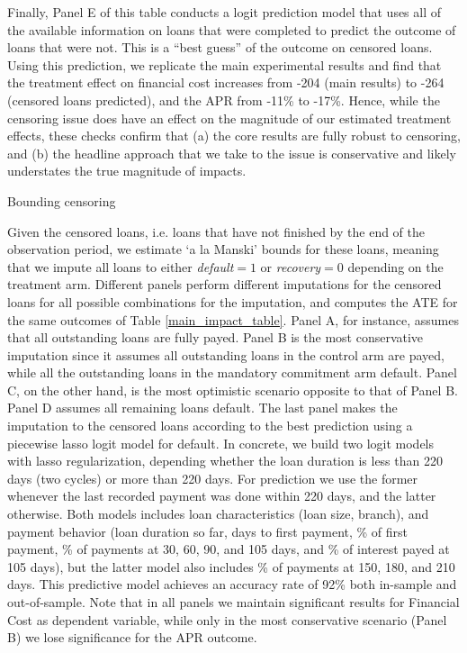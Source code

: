 \begin{appendix}
Finally, Panel E of this table conducts a logit prediction model that uses all of the available information on loans that were completed to predict the outcome of loans that were not.  This is a ``best guess'' of the outcome on censored loans.  Using this prediction, we replicate the main experimental results and find that the treatment effect on financial cost increases from -204 (main results) to -264 (censored loans predicted), and the APR from -11\% to -17\%.  Hence, while the censoring issue does have an effect on the magnitude of our estimated treatment effects, these  checks confirm that (a) the core results are fully robust to censoring, and (b) the headline approach that we take to the issue is conservative and likely understates the true magnitude of impacts.





\begin{table}[H]
\caption{Bounding censoring} 
\label{bounding_censoring}
\begin{center}
\resizebox{0.75\textwidth}{!}{
\footnotesize{}
}
\end{center}
 
\end{table}
 \footnotesize{ Given the censored loans, i.e. loans that have not finished by the end of the observation period, we estimate `a la Manski' bounds for these loans, meaning that we impute all loans to either \emph{default}$=1$ or \emph{recovery}$=0$ depending on the treatment arm. Different panels perform different imputations for the censored loans for all possible combinations for the imputation, and computes the ATE for the same outcomes of Table \ref{main_impact_table}. Panel A, for instance, assumes that all outstanding loans are fully payed. Panel B is the most conservative imputation since it assumes all outstanding loans in the control arm are payed, while all the outstanding loans in the mandatory commitment arm default. Panel C, on the other hand, is the most optimistic scenario opposite to that of Panel B. Panel D assumes all remaining loans default. The last panel makes the imputation to the censored loans according to the best prediction using a piecewise lasso logit model for default. In concrete, we build two logit models with lasso regularization, depending whether the loan duration is less than 220 days (two cycles) or more than 220 days. For prediction we use the former whenever the last recorded payment was done within 220 days, and the latter otherwise. Both models includes loan characteristics (loan size, branch), and payment behavior (loan duration so far, days to first payment, \% of first payment, \% of payments at 30, 60, 90, and 105 days, and \% of interest payed at 105 days), but the latter model also includes \% of payments at 150, 180, and 210 days. This predictive model achieves an accuracy rate of 92\% both in-sample and out-of-sample.
 Note that in all panels we maintain significant results for Financial Cost as dependent variable, while only in the most conservative scenario (Panel B) we lose significance for the APR outcome. }



\end{appendix}
